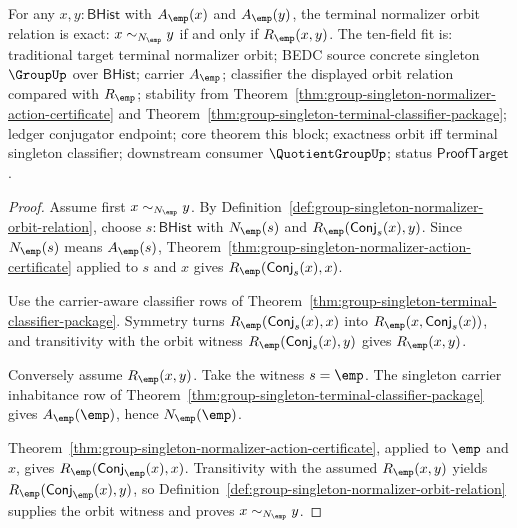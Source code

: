 \begin{theorem}
\label{thm:group-singleton-normalizer-orbit-exactness}
For any $x,y:\mathsf{BHist}$ with $A_{\emp}(x)$ and $A_{\emp}(y)$, the
terminal normalizer orbit relation is exact:
$x\sim_{N_{\emp}}y$ if and only if $R_{\emp}(x,y)$. The ten-field fit is:
traditional target terminal normalizer orbit; BEDC source concrete singleton
$\GroupUp$ over $\mathsf{BHist}$; carrier $A_{\emp}$; classifier the displayed
orbit relation compared with $R_{\emp}$; stability from
Theorem~\ref{thm:group-singleton-normalizer-action-certificate} and
Theorem~\ref{thm:group-singleton-terminal-classifier-package}; ledger
conjugator endpoint; core theorem this block; exactness orbit iff terminal
singleton classifier; downstream consumer $\QuotientGroupUp$; status
$\mathsf{ProofTarget}$.
\end{theorem}
\begin{proof}
Assume first $x\sim_{N_{\emp}}y$. By
Definition~\ref{def:group-singleton-normalizer-orbit-relation}, choose
$s:\mathsf{BHist}$ with $N_{\emp}(s)$ and
$R_{\emp}(\mathsf{Conj}_s(x),y)$. Since $N_{\emp}(s)$ means
$A_{\emp}(s)$, Theorem~\ref{thm:group-singleton-normalizer-action-certificate}
applied to $s$ and $x$ gives
$R_{\emp}(\mathsf{Conj}_s(x),x)$.

Use the carrier-aware classifier rows of
Theorem~\ref{thm:group-singleton-terminal-classifier-package}. Symmetry turns
$R_{\emp}(\mathsf{Conj}_s(x),x)$ into
$R_{\emp}(x,\mathsf{Conj}_s(x))$, and transitivity with the orbit witness
$R_{\emp}(\mathsf{Conj}_s(x),y)$ gives $R_{\emp}(x,y)$.

Conversely assume $R_{\emp}(x,y)$. Take the witness $s=\emp$. The singleton
carrier inhabitance row of
Theorem~\ref{thm:group-singleton-terminal-classifier-package} gives
$A_{\emp}(\emp)$, hence $N_{\emp}(\emp)$.

Theorem~\ref{thm:group-singleton-normalizer-action-certificate}, applied to
$\emp$ and $x$, gives $R_{\emp}(\mathsf{Conj}_{\emp}(x),x)$. Transitivity
with the assumed $R_{\emp}(x,y)$ yields
$R_{\emp}(\mathsf{Conj}_{\emp}(x),y)$, so
Definition~\ref{def:group-singleton-normalizer-orbit-relation} supplies the
orbit witness and proves $x\sim_{N_{\emp}}y$.
\end{proof}

